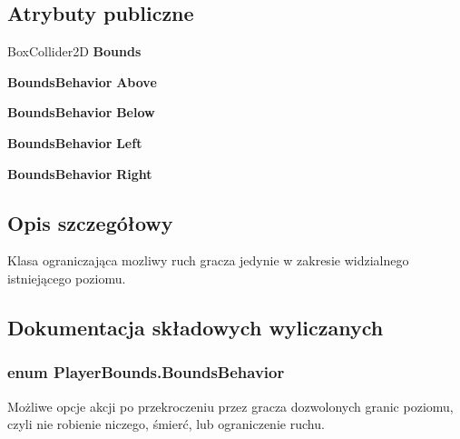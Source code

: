 \subsection*{Atrybuty publiczne}
\begin{DoxyCompactItemize}
\item 
Box\+Collider2\+D {\bfseries Bounds}\label{class_player_bounds_a02b847bc2cb2462b058462f8638c02c5}

\item 
{\bf Bounds\+Behavior} {\bfseries Above}\label{class_player_bounds_ab305ba21109a7a08d6f76556ed2beb29}

\item 
{\bf Bounds\+Behavior} {\bfseries Below}\label{class_player_bounds_ae1a36c22e63c4142e1ff336031a783fc}

\item 
{\bf Bounds\+Behavior} {\bfseries Left}\label{class_player_bounds_aba283a79471d6b0b3193a253a6a39df4}

\item 
{\bf Bounds\+Behavior} {\bfseries Right}\label{class_player_bounds_a66f6fea9ec80550b8929561160bd1144}

\end{DoxyCompactItemize}


\subsection{Opis szczegółowy}
Klasa ograniczająca mozliwy ruch gracza jedynie w zakresie widzialnego istniejącego poziomu. 



\subsection{Dokumentacja składowych wyliczanych}
\subsubsection[{Bounds\+Behavior}]{\setlength{\rightskip}{0pt plus 5cm}enum {\bf Player\+Bounds.\+Bounds\+Behavior}\hspace{0.3cm}{\ttfamily [strong]}}\label{class_player_bounds_a5ce066d86d3a67d29e60c4cc10e198ae}


Możliwe opcje akcji po przekroczeniu przez gracza dozwolonych granic poziomu, czyli nie robienie niczego, śmierć, lub ograniczenie ruchu. 



